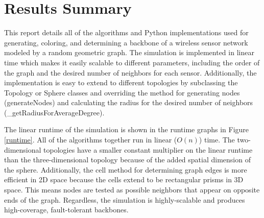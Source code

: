 \documentclass{article}
\begin{document}
\section{Results Summary}
This report details all of the algorithms and Python implementations used for generating, coloring, and determining a backbone of a wireless sensor network modeled by a random geometric graph. The simulation is implemented in linear time which makes it easily scalable to different parameters, including the order of the graph and the desired number of neighbors for each sensor. Additionally, the implementation is easy to extend to different topologies by subclassing the Topology or Sphere classes and overriding the method for generating nodes (generateNodes) and calculating the radius for the desired number of neighbors (\_getRadiusForAverageDegree).
\par
The linear runtime of the simulation is shown in the runtime graphs in Figure \ref{runtime}. All of the algorithms together run in linear ($O(n)$) time. The two-dimensional topologies have a smaller constant multiplier on the linear runtime than the three-dimensional topology because of the added spatial dimension of the sphere. Additionally, the cell method for determining graph edges is more efficient in 2D space because the cells extend to be rectangular prisms in 3D space. This means nodes are tested as possible neighbors that appear on opposite ends of the graph. Regardless, the simulation is highly-scalable and produces high-coverage, fault-tolerant backbones.

\newpage
\end{document}
